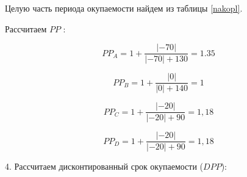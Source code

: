 Целую часть периода окупаемости найдем из таблицы \ref{nakopl}.

\begin{table}[!h]
	\label{nakopl}
	\caption{Сальдо накопленного денежного потока}
\end{table}

Рассчитаем $PP$ \cite[109]{kasyanenko2}:

\[ PP_A =  1 + \dfrac{|-70|}{|-70| + 130} = 1.35\]

\[ PP_B =  1 + \dfrac{|0|}{|0| + 140} = 1\]

\[ PP_C =  1 + \dfrac{|-20|}{|-20| + 90} = 1,18 \]

\[ PP_D = 1+ \dfrac{|-20|}{|-20| + 90} = 1,18 \]

4. Рассчитаем дисконтированный срок окупаемости ($DPP$):

